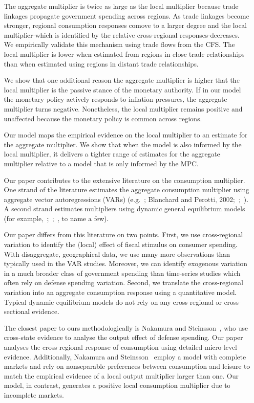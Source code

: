 \documentclass[\latexroot/\projectname]{subfiles}
\begin{document}
The aggregate multiplier is twice as large as the local multiplier because trade linkages propagate government spending across regions. As trade linkages become stronger, regional consumption responses comove to a larger degree and the local multiplier-which is identified by the relative cross-regional responses-decreases. We empirically validate this mechanism using trade flows from the CFS. The local multiplier is lower when estimated from regions in close trade relationships than when estimated using regions in distant trade relationships.

We show that one additional reason the aggregate multiplier is higher that the local multiplier is the passive stance of the monetary authority. If in our model the monetary policy actively responds to inflation pressures, the aggregate multiplier turns negative. Nonetheless, the local multiplier remains positive and unaffected because the monetary policy is common across regions.

Our model maps the empirical evidence on the local multiplier to an estimate for the aggregate multiplier. We show that when the model is also informed by the local multiplier, it delivers a tighter range of estimates for the aggregate multiplier relative to a model that is only informed by the MPC.

Our paper contributes to the extensive literature on the consumption multiplier. One strand of the literature estimates the aggregate consumption multiplier using aggregate vector autoregressions (VARs) (e.g.~\cite{Ramey1998-as}; Blanchard and Perotti, 2002;~\cite{Perotti2004-fu};~\cite{Barro2010-yy}). A second strand estimates multipliers using dynamic general equilibrium models (for example,~\cite{Baxter1990-mo};~\cite{Christiano2011-ro};~\cite{Drautzburg2015-ie}, to name a few).

Our paper differs from this literature on two points. First, we use cross-regional variation to identify the (local) effect of fiscal stimulus on consumer spending. With disaggregate, geographical data, we use many more observations than typically used in the VAR studies. Moreover, we can identify exogenous variation in a much broader class of government spending than time-series studies which often rely on defense spending variation. Second, we translate the cross-regional variation into an aggregate consumption response using a quantitative model. Typical dynamic equilibrium models do not rely on any cross-regional or cross-sectional evidence.

The closest paper to ours methodologically is Nakamura and Steinsson~\cite{Nakamura2011-dw}, who use cross-state evidence to analyse the output effect of defense spending. Our paper analyses the cross-regional response of consumption using detailed micro-level evidence. Additionally, Nakamura and Steinsson~\cite{Nakamura2011-dw} employ a model with complete markets and rely on nonseparable preferences between consumption and leisure to match the empirical evidence of a local output multiplier larger than one. Our model, in contrast, generates a positive local consumption multiplier due to incomplete markets.
\end{document}
